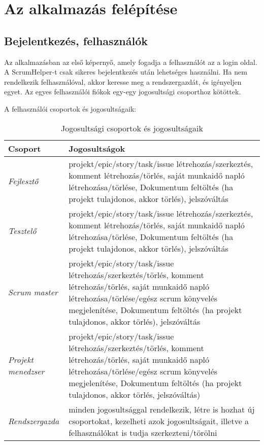 \newpage

\section{Az alkalmazás felépítése}

\subsection{Bejelentkezés, felhasználók}

Az alkalmazásban az első képernyő, amely fogadja a felhasználót az a login oldal. A ScrumHelper-t csak sikeres bejelentkezés után lehetséges használni. Ha nem rendelkezik felhasználóval, akkor keresse meg a rendszergazdát, és igényeljen egyet. Az egyes felhasználói fiókok egy-egy jogosultsági csoporthoz kötöttek. 

A felhasználói csoportok és jogosultságaik:

\begin{table}[H]
	\centering
	\begin{tabular}{ | m{} | m{} | }
		\hline
		\textbf{Csoport} & \textbf{Jogosultságok} \\
		\hline \hline
		\emph{Fejlesztő} & projekt/epic/story/task/issue létrehozás/szerkeztés, komment létrehozás/törlés, saját munkaidő napló létrehozása/törlése, Dokumentum feltöltés (ha projekt tulajdonos, akkor törlés), jelszóváltás \\
		\hline
		\emph{Tesztelő} &   projekt/epic/story/task/issue létrehozás/szerkeztés, komment létrehozás/törlés, saját munkaidő napló létrehozása/törlése, Dokumentum feltöltés (ha projekt tulajdonos, akkor törlés), jelszóváltás \\
		\hline
		\emph{Scrum master} & projekt/epic/story/task/issue létrehozás/szerkeztés/törlés, komment létrehozás/törlés, saját munkaidő napló létrehozása/törlése/egész scrum könyvelés megjelenítése, Dokumentum feltöltés (ha projekt tulajdonos, akkor törlés), jelszóváltás \\
		\hline
		\emph{Projekt menedzser} & projekt/epic/story/task/issue létrehozás/szerkeztés/törlés, komment létrehozás/törlés, saját munkaidő napló létrehozása/törlése/egész scrum könyvelés megjelenítése, Dokumentum feltöltés (ha projekt tulajdonos, akkor törlés, jelszóváltás) \\
		\hline
		\emph{Rendszergazda} & minden jogosultsággal rendelkezik, létre is hozhat új csoportokat, kezelheti azok jogosultságait, illetve a felhasználókat is tudja szerkezteni/törölni \\
		\hline
	\end{tabular}
	\caption{Jogosultsági csoportok és jogosultságaik}
	\label{tab:example-1}
\end{table}

